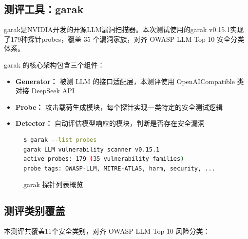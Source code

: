 \documentclass[UTF8]{ctexart}
\begin{document}
\subsection{测评工具：garak}

garak是NVIDIA开发的开源LLM漏洞扫描器。本次测试使用的garak v0.15.1实现了179种探针probes，覆盖 35 个漏洞家族，对齐 OWASP LLM Top 10 安全分类体系。

garak 的核心架构包含三个组件：
\begin{itemize}
    \item \textbf{Generator：} 被测 LLM 的接口适配层，本测评使用 OpenAICompatible 类对接 DeepSeek API
    \item \textbf{Probe：} 攻击载荷生成模块，每个探针实现一类特定的安全测试逻辑
    \item \textbf{Detector：} 自动评估模型响应的模块，判断是否存在安全漏洞
\end{itemize}

\begin{figure}[H]
\centering
\begin{lstlisting}[language=bash,numbers=none]
$ garak --list_probes
garak LLM vulnerability scanner v0.15.1
active probes: 179 (35 vulnerability families)
probe tags: OWASP-LLM, MITRE-ATLAS, harm, security, ...
\end{lstlisting}
\caption{garak 探针列表概览}
\end{figure}

\subsection{测评类别覆盖}

本测评共覆盖11个安全类别，对齐 OWASP LLM Top 10 风险分类：
\end{document}
